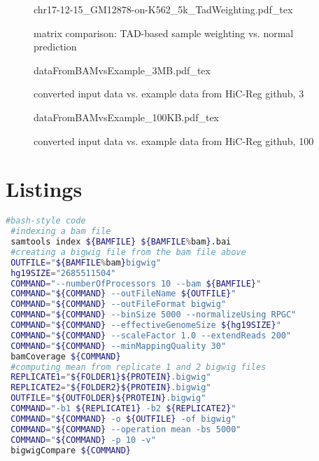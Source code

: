 \begin{appendices}
 \begin{figure}[hb]
 \centering
 \scriptsize
 {chr17-12-15_GM12878-on-K562_5k_TadWeighting.pdf_tex}
 \caption{matrix comparison: TAD-based sample weighting vs. normal prediction}
 \label{fig:app:GM12878:K562:chr17:TadWeighting}
\end{figure}

\begin{figure}[hb]
 \centering
 \scriptsize
 {dataFromBAMvsExample_3MB.pdf_tex}
 \caption{converted input data vs. example data from HiC-Reg github, \SI{3}{\mega\bp}}
 \label{fig:app:GM12878:CTCF:convertedInput3MB}
\end{figure}
\begin{figure}[hb]
 \centering
 \scriptsize
 {dataFromBAMvsExample_100KB.pdf_tex}
 \caption{converted input data vs. example data from HiC-Reg github, \SI{100}{\kilo\bp}}
 \label{fig:app:GM12878:CTCF:convertedInput100KB}
\end{figure}



\clearpage
\section*{Listings}

\begin{lstlisting}[language=bash, caption=bam to bigwig, label=list:methods:bamtobigwig]
 #bash-style code
 #indexing a bam file
 samtools index ${BAMFILE} ${BAMFILE%bam}.bai
 #creating a bigwig file from the bam file above
 OUTFILE="${BAMFILE%bam}bigwig"
 hg19SIZE="2685511504"
 COMMAND="--numberOfProcessors 10 --bam ${BAMFILE}" 
 COMMAND="${COMMAND} --outFileName ${OUTFILE}"
 COMMAND="${COMMAND} --outFileFormat bigwig" 
 COMMAND="${COMMAND} --binSize 5000 --normalizeUsing RPGC"
 COMMAND="${COMMAND} --effectiveGenomeSize ${hg19SIZE}"
 COMMAND="${COMMAND} --scaleFactor 1.0 --extendReads 200"
 COMMAND="${COMMAND} --minMappingQuality 30"
 bamCoverage ${COMMAND}
 #computing mean from replicate 1 and 2 bigwig files
 REPLICATE1="${FOLDER1}${PROTEIN}.bigwig"
 REPLICATE2="${FOLDER2}${PROTEIN}.bigwig"
 OUTFILE="${OUTFOLDER}${PROTEIN}.bigwig"
 COMMAND="-b1 ${REPLICATE1} -b2 ${REPLICATE2}"
 COMMAND="${COMMAND} -o ${OUTFILE} -of bigwig"
 COMMAND="${COMMAND} --operation mean -bs 5000"
 COMMAND="${COMMAND} -p 10 -v"
 bigwigCompare ${COMMAND}
\end{lstlisting}


\end{appendices}
